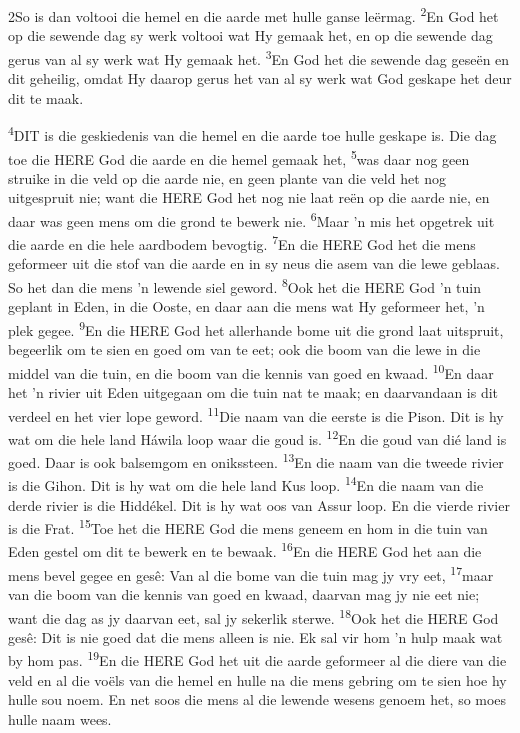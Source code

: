 \documentclass[10pt,oneside,a4paper]{memoir}
\renewcommand{\verse}[1]{\textsuperscript{#1}}
\begin{document}
\begin{paracol}{2}
\lettrine{2}So is dan voltooi die hemel en die aarde met hulle ganse leërmag.
\verse{2}En God het op die sewende dag sy werk voltooi wat Hy gemaak het, en op die sewende dag gerus van al sy werk wat Hy gemaak het.
\verse{3}En God het die sewende dag geseën en dit geheilig, omdat Hy daarop gerus het van al sy werk wat God geskape het deur dit te maak.

\verse{4}DIT is die geskiedenis van die hemel en die aarde toe hulle geskape is. Die dag toe die HERE God die aarde en die hemel gemaak het,
\verse{5}was daar nog geen struike in die veld op die aarde nie, en geen plante van die veld het nog uitgespruit nie; want die HERE God het nog nie laat reën op die aarde nie, en daar was geen mens om die grond te bewerk nie.
\verse{6}Maar ’n mis het opgetrek uit die aarde en die hele aardbodem bevogtig.
\verse{7}En die HERE God het die mens geformeer uit die stof van die aarde en in sy neus die asem van die lewe geblaas. So het dan die mens ’n lewende siel geword.
\verse{8}Ook het die HERE God ’n tuin geplant in Eden, in die Ooste, en daar aan die mens wat Hy geformeer het, ’n plek gegee.
\verse{9}En die HERE God het allerhande bome uit die grond laat uitspruit, begeerlik om te sien en goed om van te eet; ook die boom van die lewe in die middel van die tuin, en die boom van die kennis van goed en kwaad.
\verse{10}En daar het ’n rivier uit Eden uitgegaan om die tuin nat te maak; en daarvandaan is dit verdeel en het vier lope geword.
\verse{11}Die naam van die eerste is die Pison. Dit is hy wat om die hele land Háwila loop waar die goud is.
\verse{12}En die goud van dié land is goed. Daar is ook balsemgom en onikssteen.
\verse{13}En die naam van die tweede rivier is die Gihon. Dit is hy wat om die hele land Kus loop.
\verse{14}En die naam van die derde rivier is die Hiddékel. Dit is hy wat oos van Assur loop. En die vierde rivier is die Frat.
\verse{15}Toe het die HERE God die mens geneem en hom in die tuin van Eden gestel om dit te bewerk en te bewaak.
\verse{16}En die HERE God het aan die mens bevel gegee en gesê: Van al die bome van die tuin mag jy vry eet,
\verse{17}maar van die boom van die kennis van goed en kwaad, daarvan mag jy nie eet nie; want die dag as jy daarvan eet, sal jy sekerlik sterwe.
\verse{18}Ook het die HERE God gesê: Dit is nie goed dat die mens alleen is nie. Ek sal vir hom ’n hulp maak wat by hom pas.
\verse{19}En die HERE God het uit die aarde geformeer al die diere van die veld en al die voëls van die hemel en hulle na die mens gebring om te sien hoe hy hulle sou noem. En net soos die mens al die lewende wesens genoem het, so moes hulle naam wees.

\end{paracol}
\end{document}
